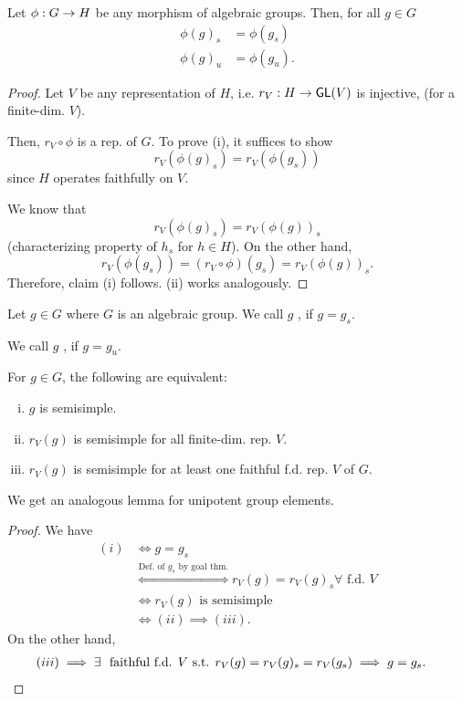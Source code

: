 \begin{corollary}
Let $\phi : G \overset{}{\rightarrow} H$ be any morphism of algebraic groups. Then, for all $g \in G$
\begin{align*}
\phi(g)_s &= \phi(g_s)\\
\phi(g)_u &= \phi(g_u).
\end{align*}
\end{corollary}
\begin{proof}
Let $V$ be any  representation of $H$, i.e. $r_V : H \overset{}{\rightarrow} \textsf{GL}(V)$ is injective, (for a finite-dim. $V$).

Then, $r_V \circ \phi$ is a rep. of $G$. To prove (i), it suffices to show
\[r_V(\phi(g)_s)  = r_V(\phi(g_s))\]
since $H$ operates faithfully on $V$.

We know that
\[r_V(\phi(g)_s) = r_V(\phi(g))_s \]
(characterizing property of $h_s$ for $h \in H$).
On the other hand,
\[ r_V(\phi(g_s)) = (r_V\circ \phi)(g_s) = r_V(\phi(g))_s.\]
Therefore, claim (i) follows. (ii) works analogously.
\end{proof}

\begin{definition}
	Let $g \in G$ where $G$ is an algebraic group.
	We call $g$ , if $g = g_s$.
	
	We call $g$ , if $g = g_u$.
\end{definition}

\begin{lemma}
	For $g \in G$, the following are equivalent:
	\begin{enumerate}[(i)]
		\item $g$ is semisimple.
		\item $r_V(g)$ is semisimple for all finite-dim. rep. $V$.
		\item $r_V(g)$ is semisimple for at least one faithful f.d. rep. $V$ of $G$.
	\end{enumerate}
\end{lemma}
We get an analogous lemma for unipotent group elements.
\begin{proof}
	We have
	\begin{align*}
	(i) &\iff g = g_s \\
	&\overset{\text{Def. of }g_s \text{ by goal thm.}}{\iff} r_V(g) = r_V(g)_s \forall \text{ f.d. } V \\
&\iff	r_V(g) \text{ is semisimple}\\
	&\iff(ii) \implies (iii).
	\end{align*}
	On the other hand,
	\begin{align*}
	(iii) & \implies \exists~~ \text{faithful f.d. }V \text{ s.t. } r_V(g) = r_V(g)_s = r_V(g_s) \implies g = g_s.\qedhere
	\end{align*}
\end{proof}



